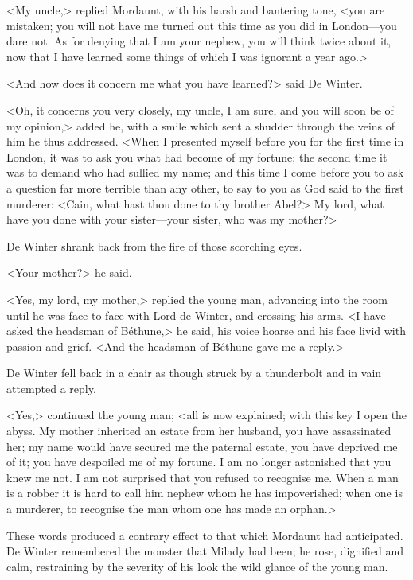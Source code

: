 <My uncle,> replied Mordaunt, with his harsh and bantering tone, <you are mistaken; you will not have me turned out this time as you did in London—you dare not. As for denying that I am your nephew, you will think twice about it, now that I have learned some things of which I was ignorant a year ago.>

<And how does it concern me what you have learned?> said De Winter.

<Oh, it concerns you very closely, my uncle, I am sure, and you will soon be of my opinion,> added he, with a smile which sent a shudder through the veins of him he thus addressed. <When I presented myself before you for the first time in London, it was to ask you what had become of my fortune; the second time it was to demand who had sullied my name; and this time I come before you to ask a question far more terrible than any other, to say to you as God said to the first murderer: <Cain, what hast thou done to thy brother Abel?> My lord, what have you done with your sister—your sister, who was my mother?>

De Winter shrank back from the fire of those scorching eyes.

<Your mother?> he said.

<Yes, my lord, my mother,> replied the young man, advancing into the room until he was face to face with Lord de Winter, and crossing his arms. <I have asked the headsman of Béthune,> he said, his voice hoarse and his face livid with passion and grief. <And the headsman of Béthune gave me a reply.>

De Winter fell back in a chair as though struck by a thunderbolt and in vain attempted a reply.

<Yes,> continued the young man; <all is now explained; with this key I open the abyss. My mother inherited an estate from her husband, you have assassinated her; my name would have secured me the paternal estate, you have deprived me of it; you have despoiled me of my fortune. I am no longer astonished that you knew me not. I am not surprised that you refused to recognise me. When a man is a robber it is hard to call him nephew whom he has impoverished; when one is a murderer, to recognise the man whom one has made an orphan.>

These words produced a contrary effect to that which Mordaunt had anticipated. De Winter remembered the monster that Milady had been; he rose, dignified and calm, restraining by the severity of his look the wild glance of the young man.

